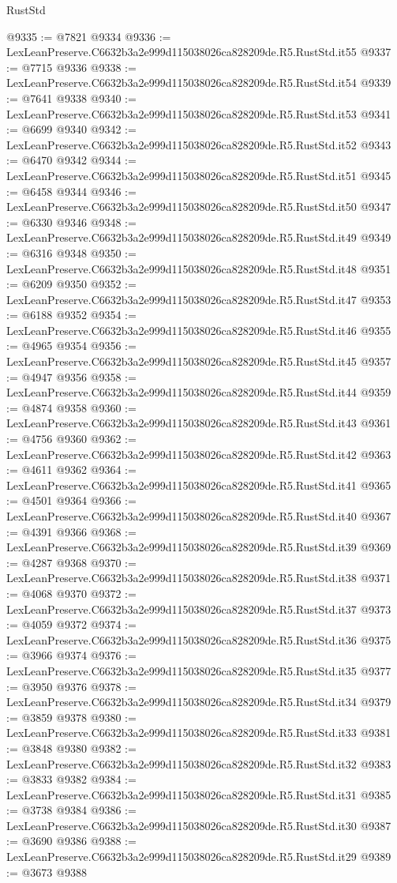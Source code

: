 \begin{lexlean}{RustStd}
\begin{coremodule}
@9335 := @7821 @9334
@9336 := LexLeanPreserve.C6632b3a2e999d115038026ca828209de.R5.RustStd.it55
@9337 := @7715 @9336
@9338 := LexLeanPreserve.C6632b3a2e999d115038026ca828209de.R5.RustStd.it54
@9339 := @7641 @9338
@9340 := LexLeanPreserve.C6632b3a2e999d115038026ca828209de.R5.RustStd.it53
@9341 := @6699 @9340
@9342 := LexLeanPreserve.C6632b3a2e999d115038026ca828209de.R5.RustStd.it52
@9343 := @6470 @9342
@9344 := LexLeanPreserve.C6632b3a2e999d115038026ca828209de.R5.RustStd.it51
@9345 := @6458 @9344
@9346 := LexLeanPreserve.C6632b3a2e999d115038026ca828209de.R5.RustStd.it50
@9347 := @6330 @9346
@9348 := LexLeanPreserve.C6632b3a2e999d115038026ca828209de.R5.RustStd.it49
@9349 := @6316 @9348
@9350 := LexLeanPreserve.C6632b3a2e999d115038026ca828209de.R5.RustStd.it48
@9351 := @6209 @9350
@9352 := LexLeanPreserve.C6632b3a2e999d115038026ca828209de.R5.RustStd.it47
@9353 := @6188 @9352
@9354 := LexLeanPreserve.C6632b3a2e999d115038026ca828209de.R5.RustStd.it46
@9355 := @4965 @9354
@9356 := LexLeanPreserve.C6632b3a2e999d115038026ca828209de.R5.RustStd.it45
@9357 := @4947 @9356
@9358 := LexLeanPreserve.C6632b3a2e999d115038026ca828209de.R5.RustStd.it44
@9359 := @4874 @9358
@9360 := LexLeanPreserve.C6632b3a2e999d115038026ca828209de.R5.RustStd.it43
@9361 := @4756 @9360
@9362 := LexLeanPreserve.C6632b3a2e999d115038026ca828209de.R5.RustStd.it42
@9363 := @4611 @9362
@9364 := LexLeanPreserve.C6632b3a2e999d115038026ca828209de.R5.RustStd.it41
@9365 := @4501 @9364
@9366 := LexLeanPreserve.C6632b3a2e999d115038026ca828209de.R5.RustStd.it40
@9367 := @4391 @9366
@9368 := LexLeanPreserve.C6632b3a2e999d115038026ca828209de.R5.RustStd.it39
@9369 := @4287 @9368
@9370 := LexLeanPreserve.C6632b3a2e999d115038026ca828209de.R5.RustStd.it38
@9371 := @4068 @9370
@9372 := LexLeanPreserve.C6632b3a2e999d115038026ca828209de.R5.RustStd.it37
@9373 := @4059 @9372
@9374 := LexLeanPreserve.C6632b3a2e999d115038026ca828209de.R5.RustStd.it36
@9375 := @3966 @9374
@9376 := LexLeanPreserve.C6632b3a2e999d115038026ca828209de.R5.RustStd.it35
@9377 := @3950 @9376
@9378 := LexLeanPreserve.C6632b3a2e999d115038026ca828209de.R5.RustStd.it34
@9379 := @3859 @9378
@9380 := LexLeanPreserve.C6632b3a2e999d115038026ca828209de.R5.RustStd.it33
@9381 := @3848 @9380
@9382 := LexLeanPreserve.C6632b3a2e999d115038026ca828209de.R5.RustStd.it32
@9383 := @3833 @9382
@9384 := LexLeanPreserve.C6632b3a2e999d115038026ca828209de.R5.RustStd.it31
@9385 := @3738 @9384
@9386 := LexLeanPreserve.C6632b3a2e999d115038026ca828209de.R5.RustStd.it30
@9387 := @3690 @9386
@9388 := LexLeanPreserve.C6632b3a2e999d115038026ca828209de.R5.RustStd.it29
@9389 := @3673 @9388

\end{coremodule}
\end{lexlean}
